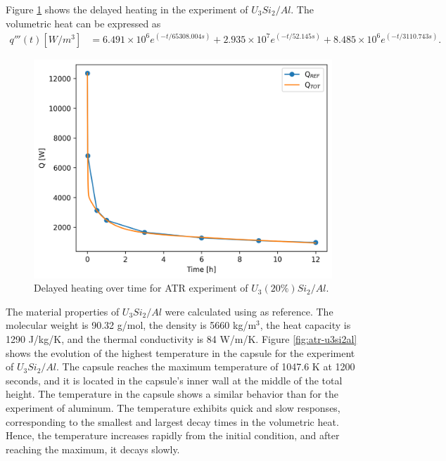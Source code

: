 Figure \ref{fig:modes-atr-2} shows the delayed heating in the experiment of $U_3Si_2/Al$.
The volumetric heat can be expressed as
\begin{align}
q'''(t) [W/m^3] &= 6.491 \times 10^6 e^{(-t/65308.004 s)} + 2.935 \times 10^7 e^{(-t/52.145 s)} + 8.485 \times 10^6 e^{(-t/3110.743 s)}.
\end{align}

\begin{figure}[htbp!] %
    \centering
    \includegraphics[width=0.45\linewidth]{figures/atr-U3Si2Al-deco-1}
    \hfill
    \caption{Delayed heating over time for ATR experiment of $U_3(20\%)Si_2/Al$.}
    \label{fig:modes-atr-2}
\end{figure}

The material properties of $U_3Si_2/Al$ were calculated using \cite{U3Si2Al} as reference.
The molecular weight is 90.32 g/mol, the density is 5660 kg/m$^3$, the heat capacity is 1290 J/kg/K, and the thermal conductivity is 84 W/m/K.
Figure \ref{fig:atr-u3si2al} shows the evolution of the highest temperature in the capsule for the experiment of $U_3Si_2/Al$.
The capsule reaches the maximum temperature of 1047.6 K at 1200 seconds, and it is located in the capsule's inner wall at the middle of the total height.
The temperature in the capsule shows a similar behavior than for the experiment of aluminum.
The temperature exhibits quick and slow responses, corresponding to the smallest and largest decay times in the volumetric heat.
Hence, the temperature increases rapidly from the initial condition, and after reaching the maximum, it decays slowly.

